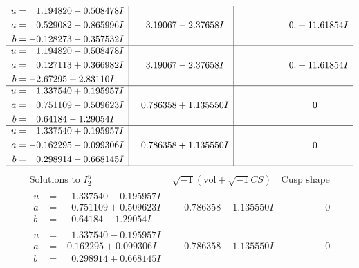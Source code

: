 \documentclass[1p]{elsarticle_modified}
\theoremstyle{definition}
\newcommand{\I}{\sqrt{-1}}
\begin{document}
$$\begin{array}{c|c|c}
\begin{aligned}
u &= \phantom{-}1.194820 - 0.508478 I \\
a &= \phantom{-}0.529082 - 0.865996 I \\
b &= -0.128273 - 0.357532 I\end{aligned}
 & \phantom{-}3.19067 - 2.37658 I & \phantom{-0.000000 -}0. + 11.61854 I \\ \hline\begin{aligned}
u &= \phantom{-}1.194820 - 0.508478 I \\
a &= \phantom{-}0.127113 + 0.366982 I \\
b &= -2.67295 + 2.83110 I\end{aligned}
 & \phantom{-}3.19067 - 2.37658 I & \phantom{-0.000000 -}0. + 11.61854 I \\ \hline\begin{aligned}
u &= \phantom{-}1.337540 + 0.195957 I \\
a &= \phantom{-}0.751109 - 0.509623 I \\
b &= \phantom{-}0.64184 - 1.29054 I\end{aligned}
 & \phantom{-}0.786358 + 1.135550 I & \phantom{-0.000000 } 0 \\ \hline\begin{aligned}
u &= \phantom{-}1.337540 + 0.195957 I \\
a &= -0.162295 - 0.099306 I \\
b &= \phantom{-}0.298914 - 0.668145 I\end{aligned}
 & \phantom{-}0.786358 + 1.135550 I & \phantom{-0.000000 } 0\\
 \hline 
 \end{array}$$\newpage$$\begin{array}{c|c|c}  
\text{Solutions to }I^u_{2}& \I (\text{vol} + \sqrt{-1}CS) & \text{Cusp shape}\\
 \hline 
\begin{aligned}
u &= \phantom{-}1.337540 - 0.195957 I \\
a &= \phantom{-}0.751109 + 0.509623 I \\
b &= \phantom{-}0.64184 + 1.29054 I\end{aligned}
 & \phantom{-}0.786358 - 1.135550 I & \phantom{-0.000000 } 0 \\ \hline\begin{aligned}
u &= \phantom{-}1.337540 - 0.195957 I \\
a &= -0.162295 + 0.099306 I \\
b &= \phantom{-}0.298914 + 0.668145 I\end{aligned}
 & \phantom{-}0.786358 - 1.135550 I & \phantom{-0.000000 } 0 \\ \hline\begin{aligned}

\end{aligned}
\end{array}$$
\end{document}
